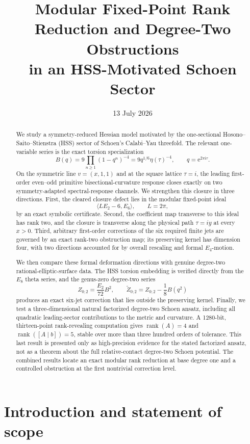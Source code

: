 \documentclass[11pt]{article}
\title{\textbf{Modular Fixed-Point Rank Reduction and Degree-Two Obstructions\\in an HSS-Motivated Schoen Sector}}
\author{}
\date{13 July 2026}
\theoremstyle{definition}
\theoremstyle{remark}
\newcommand{\ii}{\mathrm{i}}
\newcommand{\e}{\mathrm{e}}
\newcommand{\rank}{\operatorname{rank}}
\begin{document}
\maketitle

\begin{abstract}
We study a symmetry-reduced Hessian model motivated by the one-sectional Hosono--Saito--Stienstra (HSS) sector of Schoen's Calabi--Yau threefold.  The relevant one-variable series is the exact torsion specialization
\[
 B(q)=9\prod_{n\ge1}(1-q^n)^{-4}=9q^{1/6}\eta(\tau)^{-4},
 \qquad q=\e^{2\pi\ii\tau}.
\]
On the symmetric line \(v=(x,1,1)\) and at the square lattice \(\tau=i\), the leading first-order even--odd primitive bisectional-curvature response closes exactly on two symmetry-adapted spectral-response channels.  We strengthen this closure in three directions.  First, the cleared closure defect lies in the modular fixed-point ideal
\[
 \langle LE_2-6,E_6\rangle,
 \qquad L=2\pi,
\]
by an exact symbolic certificate.  Second, the coefficient map transverse to this ideal has rank two, and the closure is transverse along the physical path \(\tau=iy\) at every \(x>0\).  Third, arbitrary first-order corrections of the six required finite jets are governed by an exact rank-two obstruction map; its preserving kernel has dimension four, with two directions accounted for by overall rescaling and formal \(E_4\)-motion.

We then compare these formal deformation directions with genuine degree-two rational-elliptic-surface data.  The HSS torsion embedding is verified directly from the \(E_8\) theta series, and the genus-zero degree-two series
\[
 Z_{0;2}=\frac{E_2}{72}B^2,
 \qquad
 \widetilde Z_{0;2}=Z_{0;2}-\frac18B(q^2)
\]
produces an exact six-jet correction that lies outside the preserving kernel.  Finally, we test a three-dimensional natural factorized degree-two Schoen ansatz, including all quadratic leading-sector contributions to the metric and curvature.  A 1280-bit, thirteen-point rank-revealing computation gives \(\rank(A)=4\) and \(\rank([A\mid b])=5\), stable over more than three hundred orders of tolerance.  This last result is presented only as high-precision evidence for the stated factorized ansatz, not as a theorem about the full relative-contact degree-two Schoen potential.  The combined results locate an exact modular rank reduction at base degree one and a controlled obstruction at the first nontrivial correction level.
\end{abstract}

\section{Introduction and statement of scope}
\end{document}
